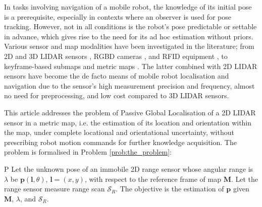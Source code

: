 In tasks involving navigation of a mobile robot, the knowledge of its initial
pose is a prerequisite, especially in contexts where an observer is used for
pose tracking. However, not in all conditions is the robot's pose predictable
or settable in advance, which gives rise to the need for its ad hoc estimation
without priors. Various sensor and map modalities have been investigated in the
literature; from 2D and 3D LIDAR sensors \cite{als_eth,Cop2018a}, RGBD cameras
\cite{Guo2016}, and RFID equipment \cite{Tzitzis2023b}, to keyframe-based
submaps \cite{Lowry2016} and metric maps \cite{Rosen2021}. The latter combined
with 2D LIDAR sensors have become the de facto means of mobile robot
localisation and navigation due to the sensor's high measurement precision and
frequency, almost no need for preprocessing, and low cost compared to 3D LIDAR
sensors.

This article addresses the problem of Passive Global Localisation of a 2D LIDAR
sensor in a metric map, i.e. the estimation of its location and orientation
within the map, under complete locational and orientational uncertainty,
without prescribing robot motion commands
for further knowledge acquisition. The problem is
formalised in Problem \ref{prob:the_problem}:

\begin{customprb}{P}
  \label{prob:the_problem}
  Let the unknown pose of an immobile 2D range sensor whose angular range is
  $\lambda$ be $\bm{p}(\bm{l},\theta)$, $\bm{l} = (x,y)$, with respect to the
  reference frame of map $\bm{M}$. Let the range sensor measure range scan
  $\mathcal{S}_R$. The objective is the estimation of $\bm{p}$ given $\bm{M}$,
  $\lambda$, and $\mathcal{S}_R$.
\end{customprb}

